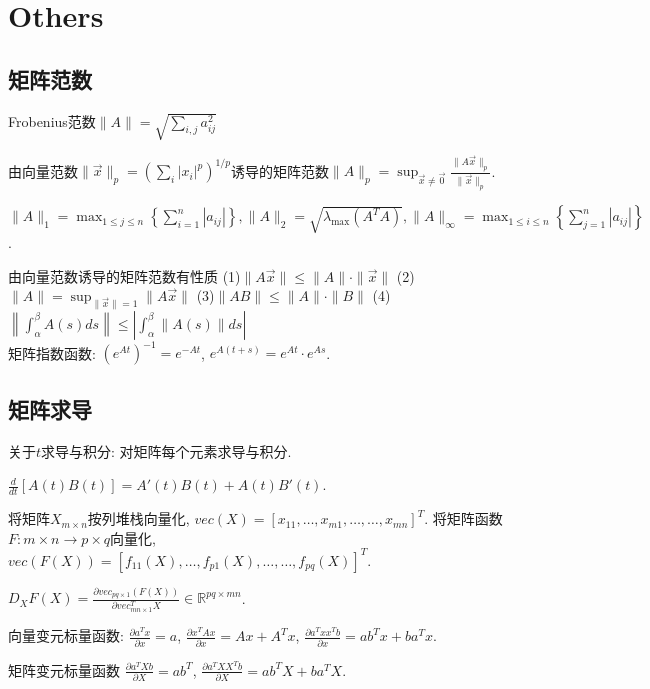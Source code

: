 \documentclass[UTF8]{ctexart}
\begin{document}
\section{Others}

\subsection{矩阵范数}

Frobenius范数$\| A\|=\sqrt{\sum_{i,j}a_{ij}^2}$

由向量范数$\| \vec{x}\| _p=(\sum _i |x_i|^p)^{1/p}$诱导的矩阵范数$\| A\|_p=\operatorname{sup}
	_{\vec{x}\neq \vec{0}} \frac{\| A\vec{x} \|_p}{\| \vec{x} \|_p}$.


$\|A\|_{1}=\max _{1 \leqslant j \leqslant n}\left\{\sum_{i=1}^{n}\left|a_{i j}\right|\right\},
	\|A\|_{2}=\sqrt{\lambda_{\max} \left(A^T A\right)},
	\|A\|_{\infty}=\max _{1 \leqslant i \leqslant n}\left\{\sum_{j=1}^{n}\left|a_{i j}\right|\right\}$. \par

由向量范数诱导的矩阵范数有性质
(1)$\|A \vec{x}\| \leqslant\|A\| \cdot\|\vec{x}\|$ \quad
(2)$\|A\|=\sup _{\|\vec{x}\|=1}\|A \vec{x}\|$ \quad
(3)$\|A B\| \leqslant\|A\| \cdot\|B\|$ \quad
(4)$\left\|\int_{\alpha}^{\beta} A(s) d s\right\| \leqslant\left|\int_{\alpha}^{\beta}\|A(s)\| d s\right|$
~\\

矩阵指数函数: $(e^{At})^{-1}=e^{-At}$, $e^{A(t+s)}=e^{At}\cdot e^{As}$.


\subsection{矩阵求导}
关于$t$求导与积分: 对矩阵每个元素求导与积分.

$\frac{d}{dt}[A(t)B(t)]=A'(t)B(t)+A(t)B'(t)$.

将矩阵$X_{m\times n}$按列堆栈向量化, $vec(X)=[x_{11},\dots,x_{m1},\dots,\dots,x_{mn}]^T$.
将矩阵函数$F:m\times n\to p\times q$向量化, $vec(F(X))=[f_{11}(X),\dots,f_{p1}(X),\dots,\dots,f_{pq}(X)]^T$.

$D_X F(X)=\frac{\partial vec_{pq\times 1}(F(X))}{\partial vec_{mn\times 1}^T X} \in \mathbb{R}^{pq\times mn}$.


向量变元标量函数:
$\frac{\partial a^Tx}{\partial x}=a$,
$\frac{\partial x^TAx}{\partial x}=Ax+A^Tx$,
$\frac{\partial a^T xx^T b}{\partial x}=ab^Tx+ba^Tx$.

矩阵变元标量函数
$\frac{\partial a^T X b}{\partial X}=ab^T$,
$\frac{\partial a^T XX^T b}{\partial X}=ab^TX+ba^TX$.
\end{document}
